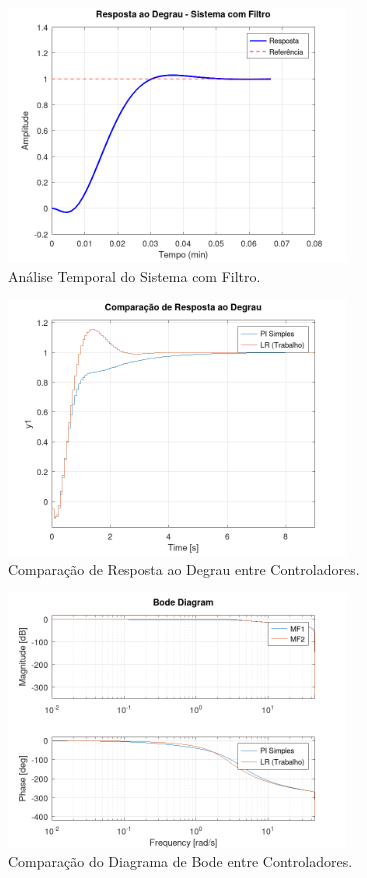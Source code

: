 \documentclass[a4paper,12pt]{article}
\begin{document}
\begin{figure}[H]
    \centering
    \includegraphics[width=0.8\textwidth]{figura_analise_temporal.png}
    \caption{Análise Temporal do Sistema com Filtro.}
    \label{fig:analise_temporal_main}
\end{figure}

\begin{figure}[H]
    \centering
    \includegraphics[width=0.8\textwidth]{figura_comparacao_step.png}
    \caption{Comparação de Resposta ao Degrau entre Controladores.}
    \label{fig:comparacao_step_main}
\end{figure}

\begin{figure}[H]
    \centering
    \includegraphics[width=0.8\textwidth]{figura_comparacao_bode.png}
    \caption{Comparação do Diagrama de Bode entre Controladores.}
    \label{fig:comparacao_bode_main}
\end{figure}
\end{document}
